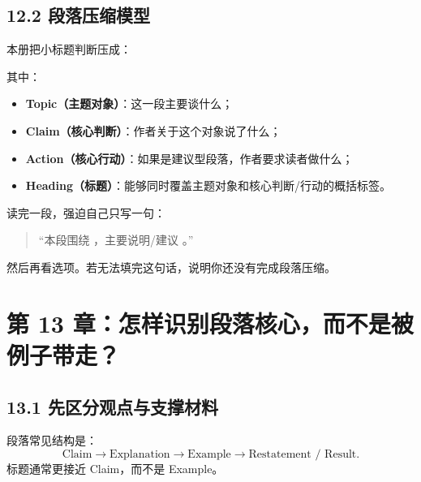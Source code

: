 \documentclass[11pt,a4paper]{ctexart}
\newcommand{\term}[2]{\textbf{#1（#2）}}
\begin{document}
\subsection{12.2 段落压缩模型}
本册把小标题判断压成：
\begin{center}
\end{center}
其中：
\begin{itemize}
  \item \term{Topic}{主题对象}：这一段主要谈什么；
  \item \term{Claim}{核心判断}：作者关于这个对象说了什么；
  \item \term{Action}{核心行动}：如果是建议型段落，作者要求读者做什么；
  \item \term{Heading}{标题}：能够同时覆盖主题对象和核心判断/行动的概括标签。
\end{itemize}

\begin{exam}[实操模板]
读完一段，强迫自己只写一句：
\begin{quote}
“本段围绕 \underline{\hspace{2.5cm}}，主要说明/建议 \underline{\hspace{4cm}}。”
\end{quote}
然后再看选项。若无法填完这句话，说明你还没有完成段落压缩。
\end{exam}

\section{第 13 章：怎样识别段落核心，而不是被例子带走？}

\subsection{13.1 先区分观点与支撑材料}
段落常见结构是：
\[
\text{Claim}
\rightarrow
\text{Explanation}
\rightarrow
\text{Example}
\rightarrow
\text{Restatement / Result}.
\]
标题通常更接近 Claim，而不是 Example。
\end{document}
